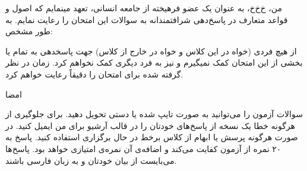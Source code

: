 
من، ‌خ‌خ‌خ، به عنوان یک عضو فرهیخته از جامعه انسانی،
تعهد مینمایم که اصول و قواعد متعارف در پاسخ‌دهی
شرافتمندانه به سوالات این امتحان را رعایت نمایم. به طور مشخص:

     از هیچ فردی (خواه در این کلاس و خواه در خارج از کلاس) جهت پاسخدهی به تمام یا بخشی از
    این امتحان کمک نمیگیرم و نیز به فرد دیگری کمک نخواهم کرد.
     زمان در نظر گرفته شده برای امتحان را دقیقاً رعایت خواهم کرد.

امضا


     سوالات آزمون را می‌توانید به صورت تایپ شده یا دستی تحویل دهید.
     برای جلوگیری از هرگونه خطا یک نسخه از پاسخ‌های خودتان را در قالب آرشیو برای من ایمیل کنید.
     در صورت هرگونه پرسش یا ابهام از کلاس برخط در حال برگزاری استفاده کنید.
     پاسخ به ۲۰ نمره از آزمون کفایت می‌کند و اضافه‌ی آن نمره‌ی امتیازی خواهد بود.
     پاسخ‌ها می‌بایست از بیان خودتان و به زبان فارسی باشند.
